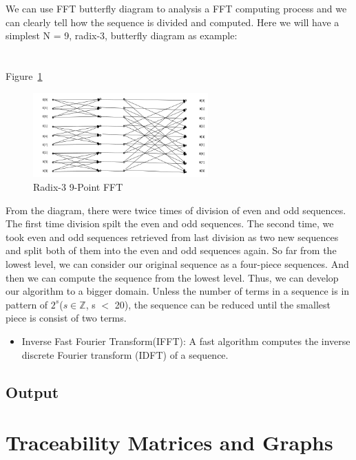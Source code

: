 \documentclass[12pt]{article}
\begin{document}
\begin{itemize}
We can use FFT butterfly diagram to analysis a FFT computing process and we can clearly tell how the sequence is divided and computed. Here we will have a simplest
N = 9, radix-3, butterfly diagram as example:\\
\\
\\
Figure~\ref{Fig_Radix-3FFT}

\begin{figure}[h!]
\begin{center}
 \includegraphics[width=0.6\textwidth]{butterflyRedix3}
\caption{Radix-3 9-Point FFT}
\label{Fig_Radix-3FFT}
\end{center}
\end{figure}

From the diagram, there were twice times of division of even and odd sequences. The first time division spilt the even and odd sequences. The second time, we took even and odd sequences retrieved from last division as two new sequences and split both of them into the even and odd sequences again. So far from the lowest level, we can consider our original sequence as a four-piece sequences. And then we can compute the sequence from the lowest level. Thus, we can develop our algorithm to a bigger domain. Unless the number of terms
in a sequence is in pattern of  $2^s$($s\in\mathbb{Z}$, s $<$ 20), the sequence can be reduced until the smallest piece is consist of two terms.

\end{itemize}

\begin{itemize}
\item Inverse Fast Fourier Transform(IFFT): A fast algorithm computes the inverse discrete Fourier transform (IDFT) of a sequence.
\end{itemize}

\subsection{Output} \label{sec_Output}    

\section{Traceability Matrices and Graphs}
\end{document}

